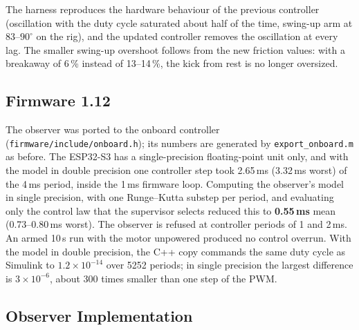 \documentclass[a4paper,11pt]{article}
\begin{document}
The harness reproduces the hardware behaviour of the previous controller (oscillation with the duty cycle saturated about half of the time, swing-up arm at $83$--$90^\circ$ on the rig), and the updated controller removes the oscillation at every lag. The smaller swing-up overshoot follows from the new friction values: with a breakaway of 6\,\% instead of 13--14\,\%, the kick from rest is no longer oversized.

\subsection{Firmware 1.12}
\label{sec:cu_firmware}
The observer was ported to the onboard controller (\nolinkurl{firmware/include/onboard.h}); its numbers are generated by \texttt{export\_onboard.m} as before. The ESP32-S3 has a single-precision floating-point unit only, and with the model in double precision one controller step took 2.65\,ms (3.32\,ms worst) of the 4\,ms period, inside the 1\,ms firmware loop. Computing the observer's model in single precision, with one Runge--Kutta substep per period, and evaluating only the control law that the supervisor selects reduced this to \textbf{0.55\,ms} mean (0.73--0.80\,ms worst). The observer is refused at controller periods of 1 and 2\,ms. An armed 10\,s run with the motor unpowered produced no control overrun. With the model in double precision, the C++ copy commands the same duty cycle as Simulink to $1.2\times10^{-14}$ over 5252 periods; in single precision the largest difference is $3\times10^{-6}$, about 300 times smaller than one step of the PWM.

\subsection{Observer Implementation}
\label{sec:cu_impl}
\end{document}
